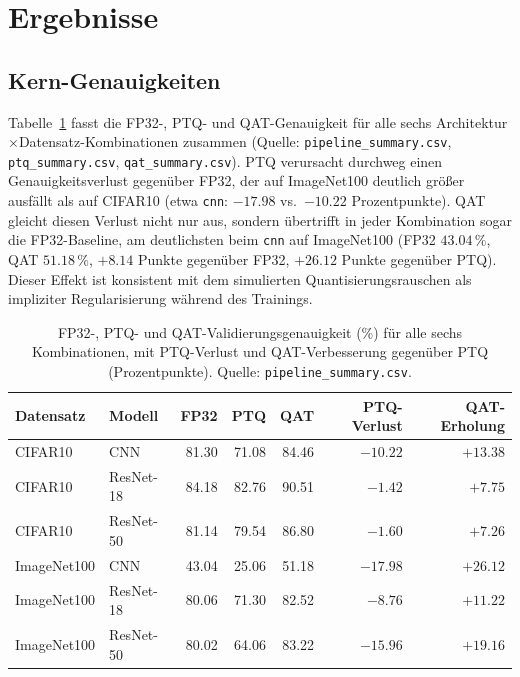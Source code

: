 \section{Ergebnisse}
\label{sec:results}

\subsection{Kern-Genauigkeiten}
\label{sec:accuracies}

Tabelle~\ref{tab:accuracy} fasst die FP32-, PTQ- und QAT-Genauigkeit für alle sechs Architektur$\times$Datensatz-Kombinationen zusammen (Quelle: \texttt{pipeline\_summary.csv}, \texttt{ptq\_summary.csv}, \texttt{qat\_summary.csv}). PTQ verursacht durchweg einen Genauigkeitsverlust gegenüber FP32, der auf ImageNet100 deutlich größer ausfällt als auf CIFAR10 (etwa \texttt{cnn}: $-17.98$ vs.\ $-10.22$ Prozentpunkte). QAT gleicht diesen Verlust nicht nur aus, sondern übertrifft in jeder Kombination sogar die FP32-Baseline, am deutlichsten beim \texttt{cnn} auf ImageNet100 (FP32 $43.04\,\%$, QAT $51.18\,\%$, $+8.14$ Punkte gegenüber FP32, $+26.12$ Punkte gegenüber PTQ). Dieser Effekt ist konsistent mit dem simulierten Quantisierungsrauschen als impliziter Regularisierung während des Trainings.

\begin{table}[t]
\centering
\small
\caption{FP32-, PTQ- und QAT-Validierungsgenauigkeit (\%) für alle sechs Kombinationen, mit PTQ-Verlust und QAT-Verbesserung gegenüber PTQ (Prozentpunkte). Quelle: \texttt{pipeline\_summary.csv}.}
\label{tab:accuracy}
\begin{tabular}{llrrrrr}
\toprule
Datensatz & Modell & FP32 & PTQ & QAT & PTQ-Verlust & QAT-Erholung \\
\midrule
CIFAR10 & CNN & 81.30 & 71.08 & 84.46 & $-10.22$ & $+13.38$ \\
CIFAR10 & ResNet-18 & 84.18 & 82.76 & 90.51 & $-1.42$ & $+7.75$ \\
CIFAR10 & ResNet-50 & 81.14 & 79.54 & 86.80 & $-1.60$ & $+7.26$ \\
ImageNet100 & CNN & 43.04 & 25.06 & 51.18 & $-17.98$ & $+26.12$ \\
ImageNet100 & ResNet-18 & 80.06 & 71.30 & 82.52 & $-8.76$ & $+11.22$ \\
ImageNet100 & ResNet-50 & 80.02 & 64.06 & 83.22 & $-15.96$ & $+19.16$ \\
\bottomrule
\end{tabular}
\end{table}

